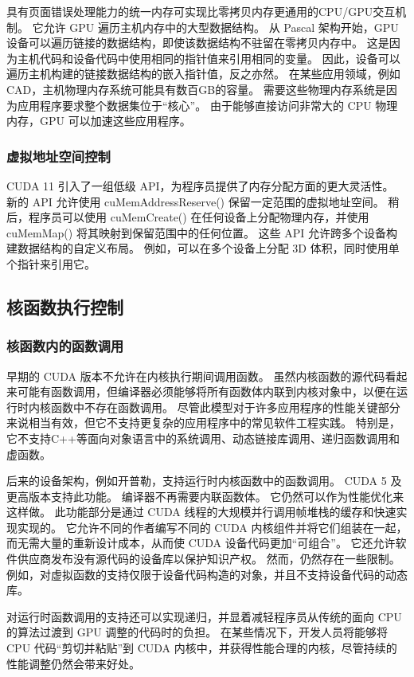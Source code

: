 具有页面错误处理能力的统一内存可实现比零拷贝内存更通用的CPU/GPU交互机制。 它允许 GPU 遍历主机内存中的大型数据结构。 从 Pascal 架构开始，GPU 设备可以遍历链接的数据结构，即使该数据结构不驻留在零拷贝内存中。 这是因为主机代码和设备代码中使用相同的指针值来引用相同的变量。 因此，设备可以遍历主机构建的链接数据结构的嵌入指针值，反之亦然。 在某些应用领域，例如CAD，主机物理内存系统可能具有数百GB的容量。 需要这些物理内存系统是因为应用程序要求整个数据集位于“核心”。 由于能够直接访问非常大的 CPU 物理内存，GPU 可以加速这些应用程序。

\subsubsection{虚拟地址空间控制}
CUDA 11 引入了一组低级 API，为程序员提供了内存分配方面的更大灵活性。 新的 API 允许使用 cuMemAddressReserve() 保留一定范围的虚拟地址空间。 稍后，程序员可以使用 cuMemCreate() 在任何设备上分配物理内存，并使用 cuMemMap() 将其映射到保留范围中的任何位置。 这些 API 允许跨多个设备构建数据结构的自定义布局。 例如，可以在多个设备上分配 3D 体积，同时使用单个指针来引用它。

\subsection{核函数执行控制}
\subsubsection{核函数内的函数调用}
早期的 CUDA 版本不允许在内核执行期间调用函数。 虽然内核函数的源代码看起来可能有函数调用，但编译器必须能够将所有函数体内联到内核对象中，以便在运行时内核函数中不存在函数调用。 尽管此模型对于许多应用程序的性能关键部分来说相当有效，但它不支持更复杂的应用程序中的常见软件工程实践。 特别是，它不支持C++等面向对象语言中的系统调用、动态链接库调用、递归函数调用和虚函数。

后来的设备架构，例如开普勒，支持运行时内核函数中的函数调用。 CUDA 5 及更高版本支持此功能。 编译器不再需要内联函数体。 它仍然可以作为性能优化来这样做。 此功能部分是通过 CUDA 线程的大规模并行调用帧堆栈的缓存和快速实现实现的。 它允许不同的作者编写不同的 CUDA 内核组件并将它们组装在一起，而无需大量的重新设计成本，从而使 CUDA 设备代码更加“可组合”。 它还允许软件供应商发布没有源代码的设备库以保护知识产权。 然而，仍然存在一些限制。 例如，对虚拟函数的支持仅限于设备代码构造的对象，并且不支持设备代码的动态库。

对运行时函数调用的支持还可以实现递归，并显着减轻程序员从传统的面向 CPU 的算法过渡到 GPU 调整的代码时的负担。 在某些情况下，开发人员将能够将 CPU 代码“剪切并粘贴”到 CUDA 内核中，并获得性能合理的内核，尽管持续的性能调整仍然会带来好处。

